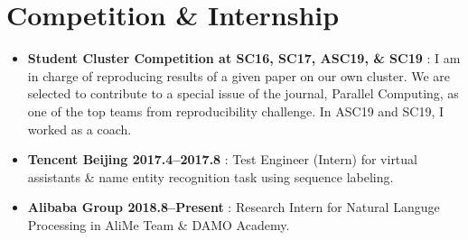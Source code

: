 \documentclass[letterpaper]{article}
\begin{document}
\section*{Competition \& Internship}
\begin{itemize}
  \item \textbf{Student Cluster Competition at SC16, SC17, ASC19, \& SC19} : I am in charge of reproducing results of a given paper on our own cluster. We are selected to contribute to a special issue of the journal, Parallel Computing, as one of the top teams from reproducibility challenge. In ASC19 and SC19, I worked as a coach.
  \item \textbf{Tencent Beijing 2017.4--2017.8} : Test Engineer (Intern) for virtual assistants \& name entity recognition task using sequence labeling.
  \item \textbf{Alibaba Group 2018.8--Present} : Research Intern for Natural Languge Processing in AliMe Team \& DAMO Academy.
\end{itemize}
\end{document}
